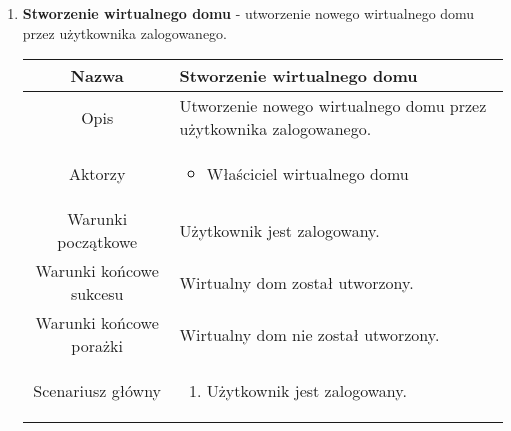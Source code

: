 \documentclass{article}
\begin{document}
\begin{enumerate}
\begin{enumerate}
			\item \textbf{Stworzenie wirtualnego domu} - utworzenie nowego wirtualnego
				domu przez użytkownika zalogowanego.
				\begin{table}[H]
					\centering
					\begin{tabular}{|c|p{7cm}|}
						\hline
						Nazwa                   & Stworzenie wirtualnego domu                                                                                                                                                                                                                                           \\
						\hline
						Opis                    & Utworzenie nowego wirtualnego domu przez użytkownika zalogowanego.                                                                                                                                                                                                    \\
						\hline
						Aktorzy                 & \begin{itemize}\item Właściciel wirtualnego domu\end{itemize}                                                                                                                                                                                                         \\
						\hline
						Warunki początkowe      & Użytkownik jest zalogowany.                                                                                                                                                                                                                                           \\
						\hline
						Warunki końcowe sukcesu & Wirtualny dom został utworzony.                                                                                                                                                                                                                                       \\
						\hline
						Warunki końcowe porażki & Wirtualny dom nie został utworzony.                                                                                                                                                                                                                                   \\
						\hline
						Scenariusz główny       & \begin{enumerate}\item Użytkownik jest zalogowany.


\end{enumerate}
\end{tabular}
\end{table}
\end{enumerate}
\end{enumerate}
\end{document}
